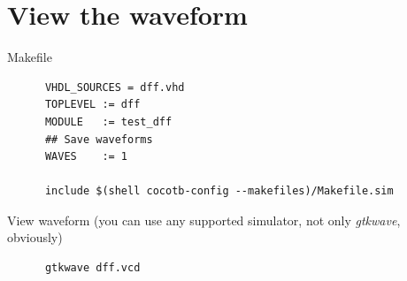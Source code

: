 \documentclass[aspectratio=169]{beamer}
\begin{document}
\section*{View the waveform}
\begin{frame}[fragile]{\secname}
  \begin{block}{Makefile}
    \begin{verbatim}
      VHDL_SOURCES = dff.vhd
      TOPLEVEL := dff
      MODULE   := test_dff
      ## Save waveforms
      WAVES    := 1

      include $(shell cocotb-config --makefiles)/Makefile.sim
    \end{verbatim}

    \begin{block}{View waveform \tiny (you can use any supported simulator, not only {\it gtkwave}, obviously)}
    \begin{verbatim}
      gtkwave dff.vcd 
    \end{verbatim}
    \end{block}
  \end{block}

    
    
\end{frame}


\end{document}
